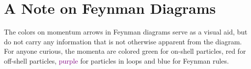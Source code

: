 \enlargethispage{\baselineskip}
\section*{A Note on Feynman Diagrams}
The colors on momentum arrows in Feynman diagrams serve as a visual aid, but do not carry any information that is not otherwise apparent from the diagram. For anyone curious, the momenta are colored \textcolor{PineGreen}{green} for on-shell particles, \textcolor{BrickRed}{red} for off-shell particles, \textcolor{Purple}{purple} for particles in loops and \textcolor{NavyBlue}{blue} for Feynman rules.
